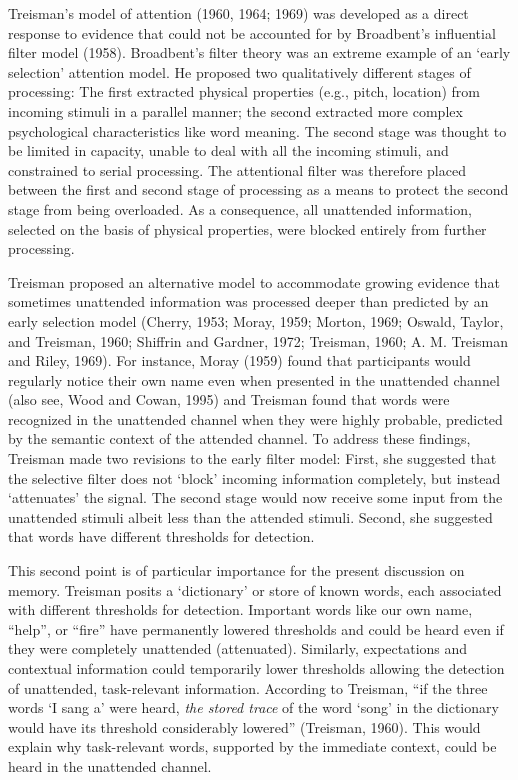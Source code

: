 \documentclass[]{DissertateCUNY}
\begin{document}
Treisman's model of attention (1960, 1964; 1969) was developed as a
direct response to evidence that could not be accounted for by
Broadbent's influential filter model (1958). Broadbent's filter theory
was an extreme example of an `early selection' attention model. He
proposed two qualitatively different stages of processing: The first
extracted physical properties (e.g., pitch, location) from incoming
stimuli in a parallel manner; the second extracted more complex
psychological characteristics like word meaning. The second stage was
thought to be limited in capacity, unable to deal with all the incoming
stimuli, and constrained to serial processing. The attentional filter
was therefore placed between the first and second stage of processing as
a means to protect the second stage from being overloaded. As a
consequence, all unattended information, selected on the basis of
physical properties, were blocked entirely from further processing.

Treisman proposed an alternative model to accommodate growing evidence
that sometimes unattended information was processed deeper than
predicted by an early selection model (Cherry, 1953; Moray, 1959;
Morton, 1969; Oswald, Taylor, and Treisman, 1960; Shiffrin and Gardner,
1972; Treisman, 1960; A. M. Treisman and Riley, 1969). For instance,
Moray (1959) found that participants would regularly notice their own
name even when presented in the unattended channel (also see, Wood and
Cowan, 1995) and Treisman found that words were recognized in the
unattended channel when they were highly probable, predicted by the
semantic context of the attended channel. To address these findings,
Treisman made two revisions to the early filter model: First, she
suggested that the selective filter does not `block' incoming
information completely, but instead `attenuates' the signal. The second
stage would now receive some input from the unattended stimuli albeit
less than the attended stimuli. Second, she suggested that words have
different thresholds for detection.

This second point is of particular importance for the present discussion
on memory. Treisman posits a `dictionary' or store of known words, each
associated with different thresholds for detection. Important words like
our own name, ``help'', or ``fire'' have permanently lowered thresholds
and could be heard even if they were completely unattended (attenuated).
Similarly, expectations and contextual information could temporarily
lower thresholds allowing the detection of unattended, task-relevant
information. According to Treisman, ``if the three words `I sang a' were
heard, \textit{the stored trace} of the word `song' in the dictionary
would have its threshold considerably lowered'' (Treisman, 1960). This
would explain why task-relevant words, supported by the immediate
context, could be heard in the unattended channel.
\end{document}
